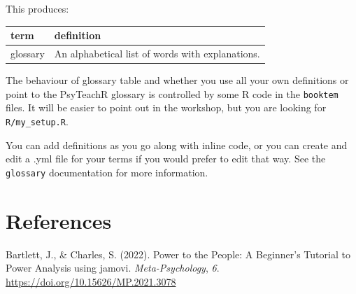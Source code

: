 \documentclass[
  letterpaper,
  DIV=11,
  numbers=noendperiod]{scrreprt}
\newlength{\cslhangindent}
\newenvironment{CSLReferences}[2] %
 {\begin{list}{}{%
  \setlength{\itemindent}{0pt}
  \setlength{\leftmargin}{0pt}
  \setlength{\parsep}{0pt}
  \ifodd #1
   \setlength{\leftmargin}{\cslhangindent}
   \setlength{\itemindent}{-1\cslhangindent}
  \fi
  \setlength{\itemsep}{#2\baselineskip}}}
 {\end{list}}
\begin{document}
This produces:

\begin{longtable*}[t]{ll}
\toprule
term & definition\\
\midrule
glossary & An alphabetical list of words with explanations.\\
\bottomrule
\end{longtable*}

The behaviour of glossary table and whether you use all your own
definitions or point to the PsyTeachR glossary is controlled by some R
code in the \texttt{booktem} files. It will be easier to point out in
the workshop, but you are looking for \texttt{R/my\_setup.R}.

You can add definitions as you go along with inline code, or you can
create and edit a .yml file for your terms if you would prefer to edit
that way. See the \texttt{glossary} documentation for more information.


\chapter*{References}\label{references-1}


\label{refs}
\begin{CSLReferences}{1}{0}
Bartlett, J., \& Charles, S. (2022). Power to the {People}: {A}
{Beginner}'s {Tutorial} to {Power} {Analysis} using jamovi.
\emph{Meta-Psychology}, \emph{6}.
\url{https://doi.org/10.15626/MP.2021.3078}

\end{CSLReferences}
\end{document}
